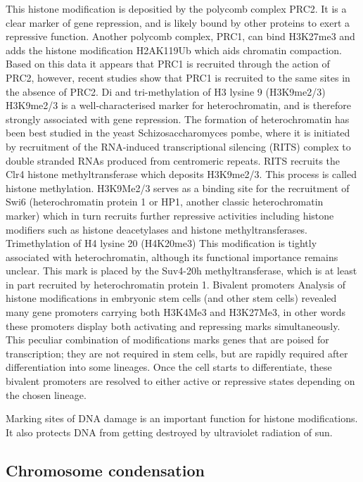 This histone modification is depositied by the polycomb complex PRC2. It is a clear marker of gene repression, and is likely bound by other proteins to exert a repressive function. Another polycomb complex, PRC1, can bind H3K27me3 and adds the histone modification H2AK119Ub which aids chromatin compaction. Based on this data it appears that PRC1 is recruited through the action of PRC2, however, recent studies show that PRC1 is recruited to the same sites in the absence of PRC2.
Di and tri-methylation of H3 lysine 9 (H3K9me2/3)
H3K9me2/3 is a well-characterised marker for heterochromatin, and is therefore strongly associated with gene repression. The formation of heterochromatin has been best studied in the yeast Schizosaccharomyces pombe, where it is initiated by recruitment of the RNA-induced transcriptional silencing (RITS) complex to double stranded RNAs produced from centromeric repeats. RITS recruits the Clr4 histone methyltransferase which deposits H3K9me2/3. This process is called histone methylation. H3K9Me2/3 serves as a binding site for the recruitment of Swi6 (heterochromatin protein 1 or HP1, another classic heterochromatin marker) which in turn recruits further repressive activities including histone modifiers such as histone deacetylases and histone methyltransferases.
Trimethylation of H4 lysine 20 (H4K20me3)
This modification is tightly associated with heterochromatin, although its functional importance remains unclear. This mark is placed by the Suv4-20h methyltransferase, which is at least in part recruited by heterochromatin protein 1.
Bivalent promoters
Analysis of histone modifications in embryonic stem cells (and other stem cells) revealed many gene promoters carrying both H3K4Me3 and H3K27Me3, in other words these promoters display both activating and repressing marks simultaneously. This peculiar combination of modifications marks genes that are poised for transcription; they are not required in stem cells, but are rapidly required after differentiation into some lineages. Once the cell starts to differentiate, these bivalent promoters are resolved to either active or repressive states depending on the chosen lineage.

Marking sites of DNA damage is an important function for histone modifications. It also protects DNA from getting destroyed by ultraviolet radiation of sun.

\hypertarget{chromosome-condensation}{%
\subsection{Chromosome condensation}\label{chromosome-condensation}}

